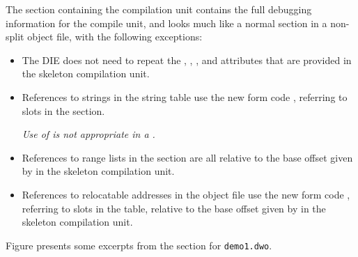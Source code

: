 The \dotdebuginfodwo{} section containing the compilation unit
contains the full debugging information for the compile unit, and
looks much like a normal \dotdebuginfo{} section in a non-split
object file, with the following exceptions:
\begin{itemize}
\item The \DWTAGcompileunit{} DIE does not need to repeat the
\DWATranges, \DWATlowpc, \DWAThighpc, and
\DWATstmtlist{} attributes that are provided in the skeleton
compilation unit.

\item References to strings in the string table use the new form
code \DWFORMstrx, referring to slots in the
\dotdebugstroffsetsdwo{} section.

\textit{Use of \DWFORMstrp{} is not appropriate in a \splitDWARFobjectfile.}

\item References to range lists in the \dotdebugranges{} section are
all relative to the base offset given by \DWATrangesbase{}
in the skeleton compilation unit.

\item References to relocatable addresses in the object file use
the new form code \DWFORMaddrx, referring to slots in the
\dotdebugaddr{} table, relative to the base offset given by
\DWATaddrbase{} in the skeleton compilation unit.
\end{itemize}

Figure  presents
some excerpts from the \dotdebuginfodwo{} section for \texttt{demo1.dwo}.

